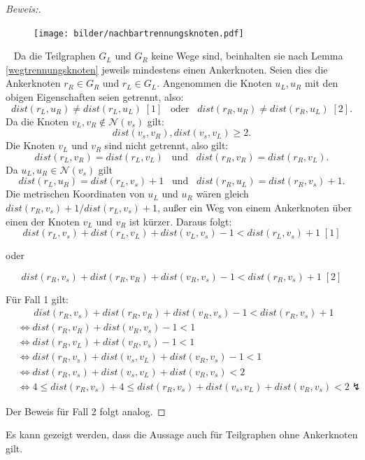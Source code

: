 \begin{proof}[Beweis:]~\newline
\vspace{-6mm}
\begin{figure}[!h]
\centering
\texttt{[image: bilder/nachbartrennungsknoten.pdf]}
\end{figure}
~\linebreak
Da die Teilgraphen $G_L$ und $G_R$ keine Wege sind, beinhalten sie nach Lemma \ref{wegtrennungsknoten} jeweils mindestens einen Ankerknoten. Seien dies die Ankerknoten $r_R \in G_R$ und $r_L \in G_L$. Angenommen die Knoten $u_L,u_R$ mit den obigen Eigenschaften seien getrennt, also: $$dist(r_L,u_R)\neq dist(r_L,u_L)\; [1]\;\;\; \text{oder}\;\;\; dist(r_R,u_R)\neq dist(r_R,u_L)\; [2].$$
  Da die Knoten $v_L, v_R \notin \mathcal{N}(v_s)$ gilt: $$dist(v_s,v_R),dist(v_s,v_L)\geq 2.$$ Die Knoten $v_L$ und $v_R$ sind nicht getrennt, also gilt: $$dist(r_L,v_R)=dist(r_L,v_L)\;\;\; \text{und}\;\;\; dist(r_R,v_R)=dist(r_R,v_L).$$ Da $u_L,u_R \in \mathcal{N}(v_s)$ gilt $$dist(r_L,u_R)=dist(r_L,v_s)+1\;\;\; \text{und}\;\;\;dist(r_R,u_L)=dist(r_R,v_s)+1.$$   
Die metrischen Koordinaten von $u_L$ und $u_R$ wären gleich $dist(r_R,v_s)+1/dist(r_L,v_s)+1$, außer ein Weg von einem Ankerknoten über einen der Knoten $v_L$ und $v_R$ ist kürzer. Daraus folgt: $$dist(r_L,v_s)+dist(r_L,v_L)+dist(v_L,v_s)-1< dist(r_L,v_s)+1\;[1]$$ \begin{center} oder \vspace{-2mm} \end{center}
$$dist(r_R,v_s)+dist(r_R,v_R)+dist(v_R,v_s)-1< dist(r_R,v_s)+1\;[2]$$ 

Für Fall 1 gilt:
\begin{align*}
&\;\;\;\;\;\;dist(r_R,v_s)+dist(r_R,v_R)+dist(v_R,v_s)-1< dist(r_R,v_s)+1\\
&\Leftrightarrow dist(r_R,v_R)+dist(v_R,v_s)-1< 1\\
&\Leftrightarrow dist(r_R,v_L)+dist(v_R,v_s)-1< 1\\
&\Leftrightarrow dist(r_R,v_s)+ dist(v_s,v_L)+dist(v_R,v_s)-1 < 1\\
&\Leftrightarrow dist(r_R,v_s)+dist(v_s,v_L)+dist(v_R,v_s)< 2\\
&\Leftrightarrow  4 \leq dist(r_R,v_s) +4 \leq dist(r_R,v_s)+dist(v_s,v_L)+dist(v_R,v_s)< 2 \lightning
\end{align*}

Der Beweis für Fall 2 folgt analog. 
  \end{proof}
Es kann gezeigt werden, dass die Aussage auch für Teilgraphen ohne Ankerknoten gilt.
